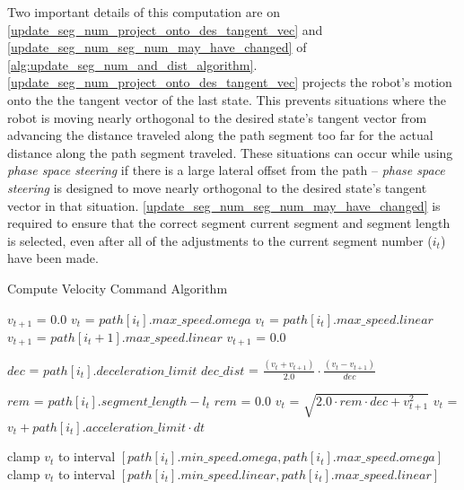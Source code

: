 Two important details of this computation are on \autoref{update_seg_num_project_onto_des_tangent_vec} and \autoref{update_seg_num_seg_num_may_have_changed} of \autoref{alg:update_seg_num_and_dist_algorithm}. \autoref{update_seg_num_project_onto_des_tangent_vec} projects the robot's motion onto the the tangent vector of the last state. This prevents situations where the robot is moving nearly orthogonal to the desired state's tangent vector from advancing the distance traveled along the path segment too far for the actual distance along the path segment traveled. These situations can occur while using \emph{phase space steering} if there is a large lateral offset from the path -- \emph{phase space steering} is designed to move nearly orthogonal to the desired state's tangent vector in that situation. \autoref{update_seg_num_seg_num_may_have_changed} is required to ensure that the correct segment current segment and segment length is selected, even after all of the adjustments to the current segment number ($i_t$) have been made.

\begin{algorithm}
\caption{Compute Velocity Command Algorithm}
\label{alg:compute_velocity_command_algorithm}
\DontPrintSemicolon


{
	$v_{t+1}$ = $0.0$ \;
	$v_t$ = $path\left[i_t\right].max\_speed.omega$ \;
}
{
	$v_t$ = $path\left[i_t\right].max\_speed.linear$ \;
	{
		$v_{t+1}$ = $path\left[i_t + 1 \right].max\_speed.linear$ \;
	}
	{
		$v_{t+1}$ = $0.0$ \;
	}
}

$dec$ = $path\left[i_t\right].deceleration\_limit$ \;
$dec\_dist$ = $\frac{\left( v_t + v_{t+1} \right)}{2.0} \cdot \frac{\left( v_t - v_{t+1} \right)}{dec}$ \;

$rem$ = $path\left[i_t\right].segment\_length - l_t$ \;
{
	$rem$ = $0.0$ \;
}
{
	$v_t$ = $\sqrt{2.0 \cdot rem \cdot dec + v_{t+1}^2}$ \;
}
\Else
{
	$v_t$ = $v_t + path\left[i_t\right].acceleration\_limit \cdot dt$ \;
}

{
	clamp $v_t$ to interval $\left[ path\left[i_t\right].min\_speed.omega, path\left[i_t\right].max\_speed.omega \right]$ \;
}
{
	clamp $v_t$ to interval $\left[ path\left[i_t\right].min\_speed.linear, path\left[i_t\right].max\_speed.linear \right]$ \;
}

\end{algorithm}

